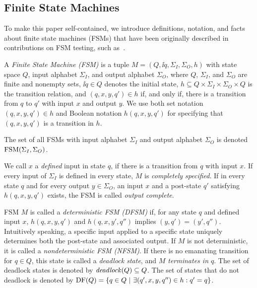 %

\subsection{Finite State Machines}

To make this paper self-contained, we introduce definitions, notation, and
facts about finite state machines (FSMs) that have been originally described
in contributions on FSM testing, such
as~\cite{petrenko_testing_2011,DBLP:conf/hase/PetrenkoY14,hierons_testing_2004}.

A \emph{Finite State Machine (FSM)} is  a tuple $M=(Q, \ii{q}, \Sigma_I,
\Sigma_O,  h)$   with state space $Q$, input alphabet $\Sigma_I$, and output
alphabet $\Sigma_O$, where $Q$, $\Sigma_I$, and $\Sigma_O$ are finite and
nonempty sets, $\ii{q}\in Q$ denotes the initial state, $h\subseteq Q\times
\Sigma_I \times \Sigma_O\times Q$ is the transition relation, and
$(q,x,y,q')\in h$ if, and only if, there is a transition from $q$ to $q'$
with input $x$ and output $y$. We use  both set notation $(q,x,y,q')\in h$
and Boolean notation $h(q,x,y,q')$ for specifying that $(q,x,y,q')$ is a
transition in $h$.

The set of all FSMs with input alphabet $\Sigma_I$ and output alphabet
$\Sigma_O$ is denoted $\text{FSM}(\Sigma_I,\Sigma_O)$.

We call $x$ a \emph{defined} input in state $q$, if there is a transition
from $q$  with input $x$. If every input of $\Sigma_I$ is defined in every
state, $M$ is \emph{completely specified}. If in every state $q$ and for
every output $y\in\Sigma_O$, an input $x$ and a post-state $q'$ satisfying
$h(q,x,y,q')$ exists, the FSM is called \emph{output complete}.

FSM $M$ is called a \emph{deterministic FSM (DFSM)} if, for any state $q$ and
defined input $x$, $h(q,x,y,q')$ and $h(q,x,y',q'')$ implies $(y,q') =
(y',q'')$. Intuitively speaking, a specific input applied to a specific state
uniquely determines both the post-state and associated output. If $M$ is not
deterministic, it is called a \emph{nondeterministic FSM (NFSM)}. If there is
no emanating transition for $q\in Q$, this state is called a \emph{deadlock
state}, and \emph{$M$ terminates in $q$}. The set of deadlock states is
denoted by ${\it deadlock}(Q)\subseteq Q$. The set of states that do not deadlock
is denoted by $\text{DF}(Q) = \{ q\in Q~|~\exists (q',x,y,q'')\in h: q' = q \}$.

